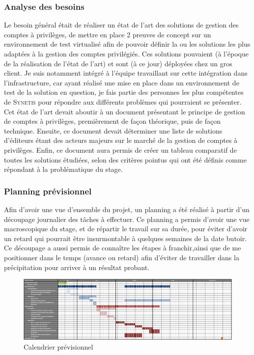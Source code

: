 \subsubsection{Analyse des besoins}
\label{besoins}
Le besoin général était de réaliser un état de l'art des solutions de gestion des comptes à privilèges, de mettre en place 2 preuves de concept sur un environnement de test virtualisé afin de pouvoir définir la ou les solutions les plus adaptées à la gestion des comptes privilégiés. Ces solutions pouvaient (à l'époque de la réalisation de l'état de l'art) et sont (à ce jour) déployées chez un gros client. Je suis notamment intégré à l'équipe travaillant sur cette intégration dans l'infrastructure, car ayant réalisé une mise en place dans un environnement de test de la solution en question, je fais partie des personnes les plus compétentes de \textsc{Synetis} pour répondre aux différents problèmes qui pourraient se présenter.\\
Cet état de l'art devait aboutir à un document présentant le principe de gestion de comptes à privilèges, premièrement de façon théorique, puis de façon technique. Ensuite, ce document devait déterminer une liste de solutions d'éditeurs étant des acteurs majeurs sur le marché de la gestion de comptes à privilèges. Enfin, ce document aura permis de créer un tableau comparatif de toutes les solutions étudiées, selon des critères pointus qui ont été définis comme répondant à la problématique du stage.

\subsubsection{Planning prévisionnel}
\label{planning}
Afin d'avoir une vue d'ensemble du projet, un planning a été réalisé à partir d'un découpage journalier des tâches à effectuer. Ce planning a permis d'avoir une vue macroscopique du stage, et de répartir le travail sur sa durée, pour éviter d'avoir un retard qui pourrait être insurmontable à quelques semaines de la date butoir. Ce découpage a aussi permis de connaître les étapes à franchir,ainsi que de me positionner dans le temps (avance ou retard) afin d'éviter de travailler dans la précipitation pour arriver à un résultat probant.\\
\begin{figure}[!ht]
    \center
    \includegraphics[width=\textwidth]{./images/calendrier_previsionnel.png}
    \caption{Calendrier prévisionnel}
\end{figure}

